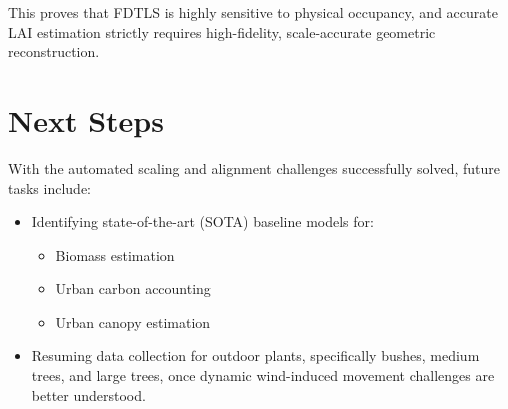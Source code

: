\documentclass[12pt]{article}
\begin{document}
This proves that FDTLS is highly sensitive to physical occupancy, and accurate LAI estimation strictly requires high-fidelity, scale-accurate geometric reconstruction.

\begin{table}[H]
    \centering
    \renewcommand{\arraystretch}{1.3}
    \caption{Final LAI estimations using the automated pipeline.}
    \label{tab:final_lai}
\end{table}

\section{Next Steps}
With the automated scaling and alignment challenges successfully solved, future tasks include:
\begin{itemize}
    \item Identifying state-of-the-art (SOTA) baseline models for:
    \begin{itemize}
        \item Biomass estimation
        \item Urban carbon accounting
        \item Urban canopy estimation
    \end{itemize}
    \item Resuming data collection for outdoor plants, specifically bushes, medium trees, and large trees, once dynamic wind-induced movement challenges are better understood.
\end{itemize}
\end{document}
